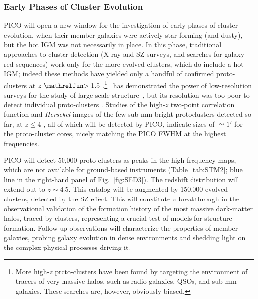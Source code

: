 \documentclass[PICOReport.tex]{subfiles}
\begin{document}
\subsubsection{Early Phases of Cluster Evolution}

PICO will open a new window for the investigation of early phases of cluster evolution, when their member galaxies were actively star forming (and dusty), but the hot \ac{IGM} was not necessarily in place. In this phase, traditional approaches to cluster detection (X-ray and SZ surveys, and searches for galaxy red sequences) work only for the more evolved clusters, which do include a hot \ac{IGM}; indeed these methods have yielded only a handful of confirmed proto-clusters at $z\simgt 1.5$ \cite{Overzier2016}.\footnote{More high-$z$ proto-clusters have been found by targeting the environment of tracers of very massive halos, such as radio-galaxies, QSOs, and sub-mm galaxies. These searches are, however, obviously biased.} \planck~has demonstrated the power of low-resolution surveys for the study of large-scale structure~\cite{Planck2016high_z}, but its resolution was too poor to detect individual proto-clusters \cite{Negrello2017protocl}.  Studies of the high-$z$ two-point correlation function \cite{Chen2016, Negrello2017protocl} and \textit{Herschel} images of the few sub-mm bright protoclusters detected so far, at $z \le 4$ \cite{Ivison2013, Wang2016, Oteo2018}, all of which will be detected by PICO, indicate sizes of $\simeq 1'$ for the proto-cluster cores, nicely matching the PICO FWHM at the highest frequencies.

PICO will detect 50,000 proto-clusters as peaks in the high-frequency maps, which are not available for ground-based instruments (Table~\ref{tab:STM2}; blue line in the right-hand panel of Fig.~\ref{fig:SED3}).
The redshift distribution will extend out to $z\sim4.5$. This catalog will be augmented by 150,000 evolved clusters, detected by the SZ effect. This will constitute a breakthrough in the observational validation of the formation history of the most massive dark-matter halos, traced by clusters, representing a crucial test of models for structure formation. Follow-up observations will characterize the properties of member galaxies, probing galaxy evolution in dense environments and shedding light on the complex physical processes driving it.
\end{document}
